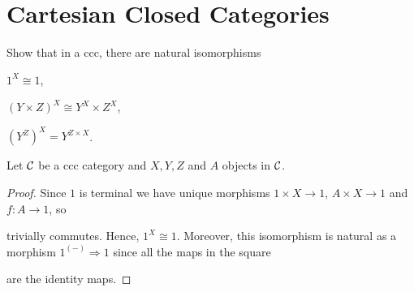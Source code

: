 \section{Cartesian Closed Categories}

\begin{exercise}{47}
    Show that in a ccc, there are natural isomorphisms 
    \begin{exercises}
        \item$1^X\cong 1$,
        \item$(Y\times Z)^X\cong Y^X\times Z^X$,
        \item$(Y^Z)^X=Y^{Z\times X}$.
    \end{exercises}
\end{exercise}
\begin{solution}
    Let $\mathcal{C}$ be a ccc category and $X,Y, Z$ and $A$ objects in $\mathcal{C}$. 
    \begin{exercises}
        \item\begin{proof}
        
        
            Since $1$ is terminal we have unique morphisms $1\times X\to 1$, $A\times X\to 1$ and $f\colon A\to 1$, so 
            trivially commutes.
            Hence, $1^X\cong 1$.
            Moreover, this isomorphism is natural as a morphism $1^{(-)}\Rightarrow 1$ since all the maps in the square 
            are the identity maps.
        \end{proof}


\end{exercises}
\end{solution}
